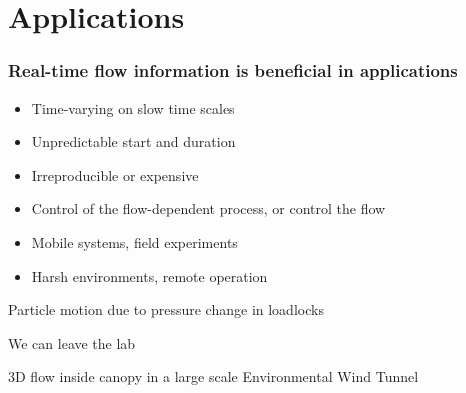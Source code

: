 %
% 
%
%
%
%
%

% 

\section{Applications}

\begin{frame}[label=app-1]
\frametitle{Real-time flow information is beneficial in applications}
\begin{itemize}
	\item Time-varying on slow time scales
    \item Unpredictable start and duration 
    \item Irreproducible or expensive %
	\item Control of the flow-dependent process, or control the flow %
    \item Mobile systems, field experiments
    \item Harsh environments, remote operation
\end{itemize}
\end{frame}

\begin{frame}[label=app-2]{Particle motion due to pressure change in loadlocks}
\centering{}
\end{frame}

\begin{frame}[label=app-3]{We can leave the lab}
\begin{multicols}{2}
\end{multicols}
\end{frame}


\begin{frame}[label=iibr-4]{3D flow inside canopy in a large scale Environmental Wind Tunnel}
\begin{columns}
\end{columns}
\end{frame}

